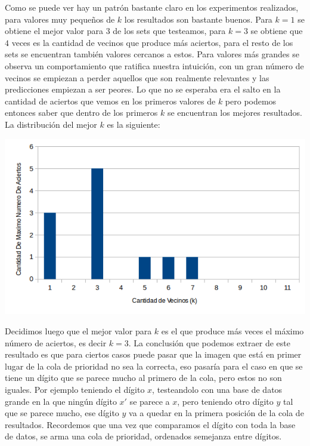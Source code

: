 Como se puede ver hay un patrón bastante claro en los experimentos realizados, para valores muy pequeños de $k$ los resultados son bastante buenos. Para $k=1$ se obtiene el mejor valor para $3$ de los sets que testeamos, para $k=3$ se obtiene que $4$ veces es la cantidad de vecinos que produce más aciertos, para el resto de los sets se encuentran también valores cercanos a estos. Para valores más grandes se observa un comportamiento que ratifica nuestra intuición, con un gran número de vecinos se empiezan a perder aquellos que son realmente relevantes y las predicciones empiezan a ser peores. Lo que no se esperaba era el salto en la cantidad de aciertos que vemos en los primeros valores de $k$ pero podemos entonces saber que dentro de los primeros $k$ se encuentran los mejores resultados.
\\
La distribución del mejor $k$ es la siguiente:
\begin{center}
\includegraphics[scale=0.55]{nuevosResultados/knn/max.png}
\end{center}
Decidimos luego que el mejor valor para $k$ es el que produce más veces el máximo número de aciertos, es decir $k=3$. La conclusión que podemos extraer de este resultado es que para ciertos casos puede pasar que la imagen que está en primer lugar de la cola de prioridad no sea la correcta, eso pasaría para el caso en que se tiene un dígito que se parece mucho al primero de la cola, pero estos no son iguales.
Por ejemplo teniendo el dígito $x$, testeandolo con una base de datos grande en la que ningún dígito $x'$ se parece a $x$, pero teniendo otro dígito $y$ tal que se parece mucho, ese dígito $y$ va a quedar en la primera posición de la cola de resultados.
Recordemos que una vez que comparamos el dígito con toda la base de datos, se arma una cola de prioridad, ordenados semejanza entre dígitos.
